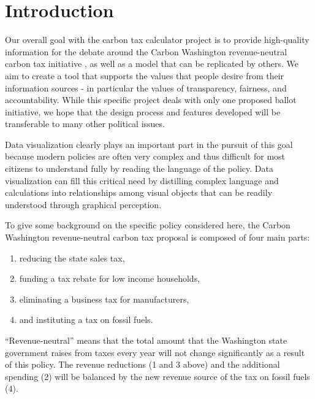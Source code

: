 \documentclass{sigchi}
\begin{document}



\section{Introduction}

Our overall goal with the carbon tax calculator project is to provide high-quality information for the debate around the Carbon Washington revenue-neutral carbon tax initiative \cite{carbonWA}, as well as a model that can be replicated by others. We aim to create a tool that supports the values that people desire from their information sources - in particular the values of transparency, fairness, and accountability. While this specific project deals with only one proposed ballot initiative, we hope that the design process and features developed will be transferable to many other political issues.

Data visualization clearly plays an important part in the pursuit of this goal because modern policies are often very complex and thus difficult for most citizens to understand fully by reading the language of the policy. Data visualization can fill this critical need by distilling complex language and calculations into relationships among visual objects that can be readily understood through graphical perception.

To give some background on the specific policy considered here, the Carbon Washington revenue-neutral carbon tax proposal is composed of four main parts: 
\begin{enumerate}
\item reducing the state sales tax,
\item funding a tax rebate for low income households,
\item eliminating a business tax for manufacturers,
\item and instituting a tax on fossil fuels.
\end{enumerate}
“Revenue-neutral” means that the total amount that the Washington state government raises 
from taxes every year will not change significantly as a result of this policy. The revenue 
reductions (1 and 3 above) and the additional spending (2) will be balanced by the new 
revenue source of the tax on fossil fuels (4).
\end{document}
